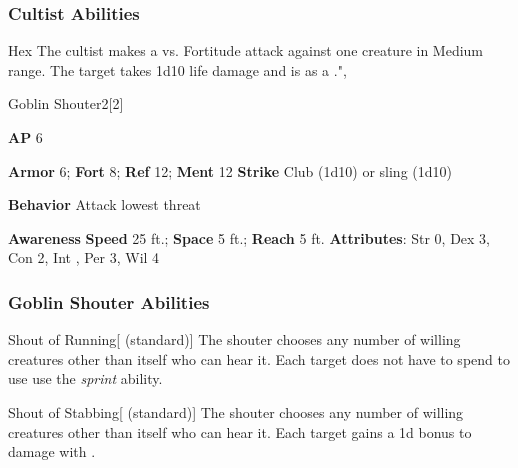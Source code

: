 \subsubsection{Cultist Abilities}

\begin{freeability}{Hex}
The cultist makes a  vs. Fortitude attack against one creature in Medium range.
\hit The target takes 1d10 life damage and is  as a .",
\end{freeability}

\begin{monsection}{Goblin Shouter}{2}[2]
\vspace{-1em}\vspace{-1em}
\begin{spellcontent}
\begin{spelltargetinginfo}
{\textbf{AP} 6}

\pari \textbf{Armor} 6;
\textbf{Fort} 8;
\textbf{Ref} 12;
\textbf{Ment} 12
\pari \textbf{Strike} Club  (1d10) or sling  (1d10)



\pari \textbf{Behavior} Attack lowest threat
\end{spelltargetinginfo}
\end{spellcontent}

\begin{monsterfooter}
\pari \textbf{Awareness} 
\pari \textbf{Speed} 25 ft.;
\textbf{Space} 5 ft.;
\textbf{Reach} 5 ft.
\pari \textbf{Attributes}:
Str 0,
Dex 3,
Con 2,
Int ,
Per 3,
Wil 4
\end{monsterfooter}
\end{monsection}


\subsubsection{Goblin Shouter Abilities}

\begin{freeability}{Shout of Running}[ (standard)]
The shouter chooses any number of willing creatures other than itself who can hear it.
Each target does not have to spend  to use use the \textit{sprint} ability.
\end{freeability}

\vspace{0.5em}
\begin{freeability}{Shout of Stabbing}[ (standard)]
The shouter chooses any number of willing creatures other than itself who can hear it.
Each target gains a \plus1d bonus to damage with .
\end{freeability}

